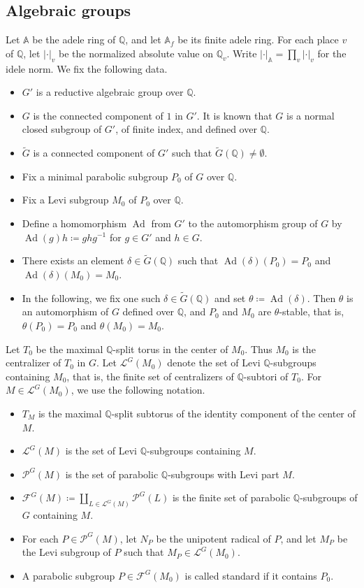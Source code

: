 \documentclass[12pt]{amsart}
\theoremstyle{definition}
\theoremstyle{plain}
\theoremstyle{remark}
\def\Q{\mathbb{Q}}%
\def\A{\mathbb{A}}%
\DeclareMathOperator{\Ad}{Ad}%
\newcommand{\cF}{\mathcal{F}}
\newcommand{\cL}{\mathcal{L}}
\newcommand{\cP}{\mathcal{P}}
\numberwithin{equation}{section}
\newcommand{\tG}{\widetilde{G}}
\begin{document}
\subsection{Algebraic groups}

Let $\A$ be the adele ring of $\Q$, and let $\A_f$ be its finite
adele ring. For each place $v$ of $\Q$, let $|\cdot|_v$ be the
normalized absolute value on $\Q_v$.
Write $|\cdot|_{\A}=\prod_v|\cdot|_v$ for the idele norm.
We fix the following data.
\begin{itemize}
\item $G'$ is a reductive algebraic group over $\Q$.
\item $G$ is the connected component of $1$ in $G'$. It is known that $G$ is a normal closed subgroup of $G'$, of finite index, and defined over $\Q$.
\item $\tG$ is a connected component of $G'$ such that
$\tG(\Q)\neq\emptyset$.
\item Fix a minimal parabolic subgroup $P_0$ of $G$ over $\Q$.
\item Fix a Levi subgroup $M_0$ of $P_0$ over $\Q$. 
\item Define a homomorphism $\Ad$ from $G'$ to the automorphism group of $G$ by $\Ad(g)h \coloneqq ghg^{-1}$ for $g \in G'$ and $h \in G$.
\item  There exists an element $\delta\in \tG(\Q)$ such that $\Ad(\delta)(P_0)=P_0$ and $\Ad(\delta)(M_0)=M_0$.
\item In the following, we fix one such $\delta \in \tG(\Q)$ and set $\theta \coloneqq \Ad(\delta)$.
      Then $\theta$ is an automorphism of $G$ defined over $\Q$, and $P_0$ and $M_0$ are $\theta$-stable, 
      that is, $\theta(P_0)=P_0$ and $\theta(M_0)=M_0$.
\end{itemize}


Let $T_0$ be the maximal $\Q$-split torus in the center of
$M_0$. 
Thus $M_0$ is the centralizer of $T_0$ in $G$.
Let $\cL^G(M_0)$ denote the set of Levi $\Q$-subgroups containing $M_0$, that is, the finite set of centralizers of $\Q$-subtori of $T_0$. 
For $M\in\cL^G(M_0)$, we use the following notation.
\begin{itemize}        
    \item $T_M$ is the maximal $\Q$-split subtorus of the identity component of the center of $M$.
    \item $\cL^G(M)$ is the set of Levi $\Q$-subgroups containing $M$. 
    \item $\cP^G(M)$ is the set of parabolic $\Q$-subgroups with Levi part $M$. 
    \item $\cF^G(M)\coloneqq\coprod_{L\in\cL^G(M)} \cP^G(L)$ is the finite set of parabolic $\Q$-subgroups of $G$ containing $M$. 
    \item For each $P\in\cP^G(M)$, let $N_P$ be the unipotent radical of $P$, and let $M_P$ be the Levi subgroup of $P$ such that $M_P\in \cL^G(M_0)$. 
    \item A parabolic subgroup $P\in\cF^G(M_0)$ is called standard if it contains $P_0$.
\end{itemize}
\end{document}

